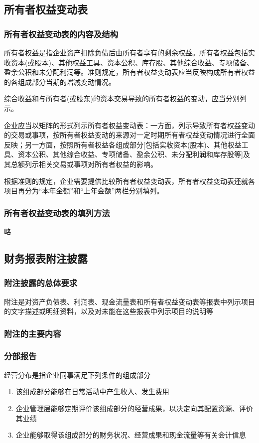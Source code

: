 \documentclass[UTF8,12pt]{ctexart}
\numberwithin{equation}{section} %
\numberwithin{figure}{section}
\numberwithin{table}{section}
\begin{document}
	
	\subsection{所有者权益变动表}
	\subsubsection{所有者权益变动表的内容及结构}
	所有者权益是指企业资产扣除负债后由所有者享有的剩余权益。所有者权益包括实收资本(或股本)、其他权益工具、资本公积、库存股、其他综合收益、专项储备、盈余公积和未分配利润等。准则规定，所有者权益变动表应当反映构成所有者权益的各组成部分当期的增减变动情况。
	
	综合收益和与所有者(或股东)的资本交易导致的所有者权益的变动，应当分别列示。
	
	企业应当以矩阵的形式列示所有者权益变动表：一方面，列示导致所有者权益变动的交易或事项，按所有者权益变动的来源对一定时期所有者权益变动情况进行全面反映；另一方面，按照所有者权益各组成部分[包括实收资本(股本)、其他权益工具、资本公积、其他综合收益、专项储备、盈余公积、未分配利润和库存股等]及其总额列示相关交易或事项对所有者权益的影响。
	
	根据准则的规定，企业需要提供比较所有者权益变动表，所有者权益变动表还就各项目再分为“本年金额”和“上年金额”两栏分别填列。
	
	\subsubsection{所有者权益变动表的填列方法}
	略
	
	\subsection{财务报表附注披露}
	\subsubsection{附注披露的总体要求}
	附注是对资产负债表、利润表、现金流量表和所有者权益变动表等报表中列示项目的文字描述或明细资料，以及对未能在这些报表中列示项目的说明等
	\subsubsection{附注的主要内容}
	\subsubsection{分部报告}
	经营分布是指企业同事满足下列条件的组成部分
	\begin{enumerate}
		\item 该组成部分能够在日常活动中产生收入、发生费用
		
		\item 企业管理层能够定期评价该组成部分的经营成果，以决定向其配置资源、评价其业绩
		
		\item 企业能够取得该组成部分的财务状况、经营成果和现金流量等有关会计信息
	\end{enumerate}
	
\end{document}
